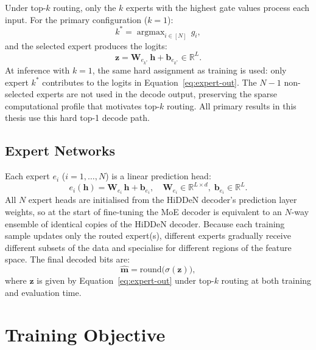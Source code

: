 ﻿\documentclass[12pt, a4paper, twoside]{report}
\numberwithin{equation}{chapter}
\begin{document}
Under top-$k$ routing, only the $k$ experts with the highest gate values process each input. For the primary configuration ($k=1$):
\begin{equation}
    k^* = \mathop{\arg\max}_{i\in[N]}\, g_i,
    \label{eq:top1}
\end{equation}
and the selected expert produces the logits:
\begin{equation}
    \mathbf{z} = \mathbf{W}_{e_{k^*}}\,\mathbf{h} + \mathbf{b}_{e_{k^*}} \in \mathbb{R}^L.
    \label{eq:expert-out}
\end{equation}
At inference with $k=1$, the same hard assignment as training is used: only expert $k^*$ contributes to the logits in Equation~\eqref{eq:expert-out}. The $N-1$ non-selected experts are not used in the decode output, preserving the sparse computational profile that motivates top-$k$ routing. All primary results in this thesis use this hard top-1 decode path.

\subsection*{Expert Networks}

Each expert $e_i$ ($i=1,\ldots,N$) is a linear prediction head:
\begin{equation}
    e_i(\mathbf{h}) = \mathbf{W}_{e_i}\,\mathbf{h} + \mathbf{b}_{e_i}, \quad
    \mathbf{W}_{e_i}\in\mathbb{R}^{L\times d},\;\mathbf{b}_{e_i}\in\mathbb{R}^L.
    \label{eq:expert-def}
\end{equation}
All $N$ expert heads are initialised from the HiDDeN decoder's prediction layer weights, so at the start of fine-tuning the MoE decoder is equivalent to an $N$-way ensemble of identical copies of the HiDDeN decoder. Because each training sample updates only the routed expert(s), different experts gradually receive different subsets of the data and specialise for different regions of the feature space. The final decoded bits are:
\begin{equation}
    \hat{\mathbf{m}} = \mathrm{round}\bigl(\sigma(\mathbf{z})\bigr),
    \label{eq:decode}
\end{equation}
where $\mathbf{z}$ is given by Equation~\eqref{eq:expert-out} under top-$k$ routing at both training and evaluation time.

\section{Training Objective}
\label{sec:training-obj}
\end{document}
